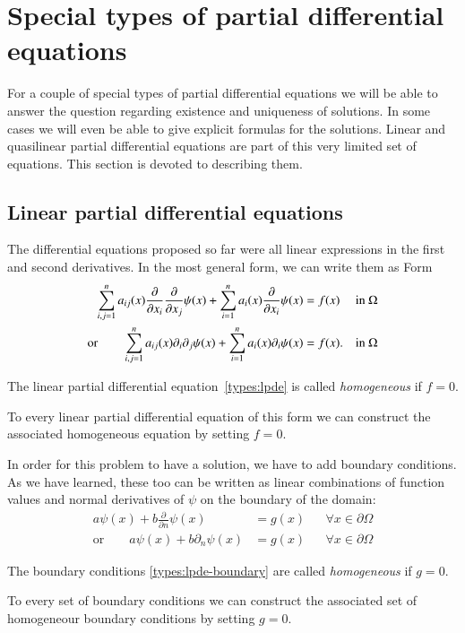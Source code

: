 %
%
%
\section{Special types of partial differential equations
\label{klassifikation:spezielletypen}}
For a couple of special types of partial differential equations we will
be able to answer the question regarding existence and uniqueness of 
solutions.
In some cases we will even be able to give explicit formulas for the solutions.
Linear and quasilinear partial differential equations are part of this
very limited set of equations.
This section is devoted to describing them.

\subsection{Linear partial differential equations\label{klassifikation:linear}}
The differential equations proposed so far were all linear expressions in
the first and second derivatives.
In the most general form, we can write them as
Form
\begin{align}
\sum_{i,j=1}^n a_{ij}(x)\frac{\partial}{\partial x_i} \frac{\partial}{\partial x_j}\psi(x)
+\sum_{i=1}^na_i(x)\frac{\partial}{\partial x_i}\psi(x)&=f(x)
&&\text{in $\Omega$}
\label{types:lpde}
\\
\text{or}\qquad
\sum_{i,j=1}^n a_{ij}(x)\partial_i \partial_j\psi(x)
+\sum_{i=1}^na_i(x)\partial_i\psi(x)&=f(x).
&&\text{in $\Omega$}
\notag
\end{align}
\begin{definition}
\label{definition:homogeneous-equation}
The linear partial differential equation~\eqref{types:lpde}
is called {\em homogeneous} if $f=0$.
\end{definition}
To every linear partial differential equation of this form we can construct
the associated homogeneous equation by setting $f=0$.

In order for this problem to have a solution, we have to add boundary
conditions.
As we have learned, these too can be written as linear combinations
of function values and normal derivatives of $\psi$ on the boundary
of the domain:
\begin{align}
a\psi(x)+
b\frac{\partial}{\partial n}\psi(x)
&=g(x)
&&\forall x\in\partial \Omega
\label{types:lpde-boundary}
\\
\text{or}\qquad
a\psi(x)+b\partial_n\psi(x)&=g(x)
&&\forall x\in\partial \Omega
\end{align}
\begin{definition}
\label{definition:homogeneous-boundary}
The boundary conditions
\eqref{types:lpde-boundary}
are called {\em homogeneous} if $g=0$.
\end{definition}
To every set of boundary conditions we can construct the associated
set of homogeneour boundary conditions by setting $g=0$.

